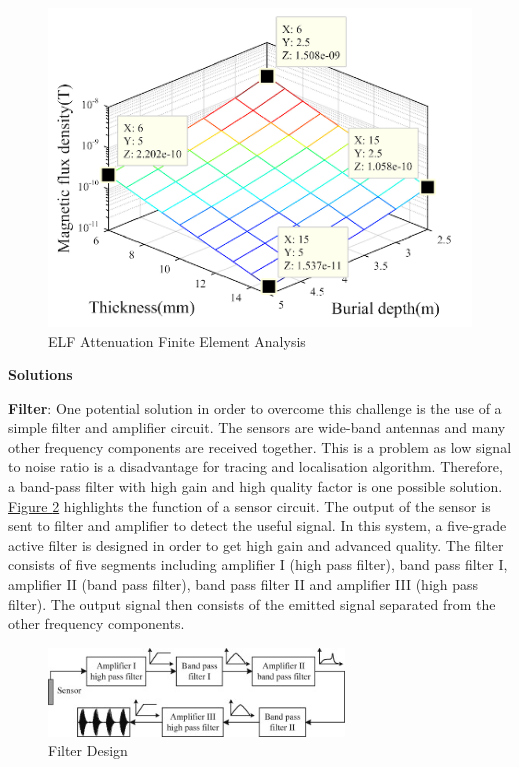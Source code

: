 \documentclass[11pt]{article}		%
\newlength{\imageheight}	 %
\newcommand{\figref}[1]{\hyperref[#1]{Figure \ref*{#1}}}    %
\begin{document}
		    \begin{figure}[h]
				\centering
				\includegraphics[height = \imageheight]{Attenuation.png}
				\caption{ELF Attenuation Finite Element Analysis}
				\label{ELFAttenuation}
			\end{figure}
	
			\textbf{Solutions}
			
			\textbf{Filter}:
	        One potential solution in order to overcome this challenge is the use of a simple filter and amplifier circuit.
	        The sensors are wide-band antennas and many other frequency components are received together. This is a problem as low signal to noise ratio is a disadvantage for tracing and localisation algorithm.
	        Therefore, a band-pass filter with high gain and high quality factor is one possible solution.
	        \\
	        \hspace*{3ex}\figref{filterDesign} highlights the function of a sensor circuit.
	        The output of the sensor is sent to filter and amplifier to detect the useful signal. 
	        In this system, a five-grade active filter is designed in order to get high gain and advanced quality.
	        The filter consists of five segments including amplifier I (high pass filter), band pass filter I, amplifier II (band pass filter), band pass filter II and amplifier III (high pass filter).
	        The output signal then consists of the emitted signal separated from the other frequency components. 
	        
	        \begin{figure}[h]
				\centering
				\includegraphics[width = 0.7\textwidth]{Filtering.jpg}
				\caption{Filter Design} %
				\label{filterDesign}
			\end{figure}
			
\end{document}
